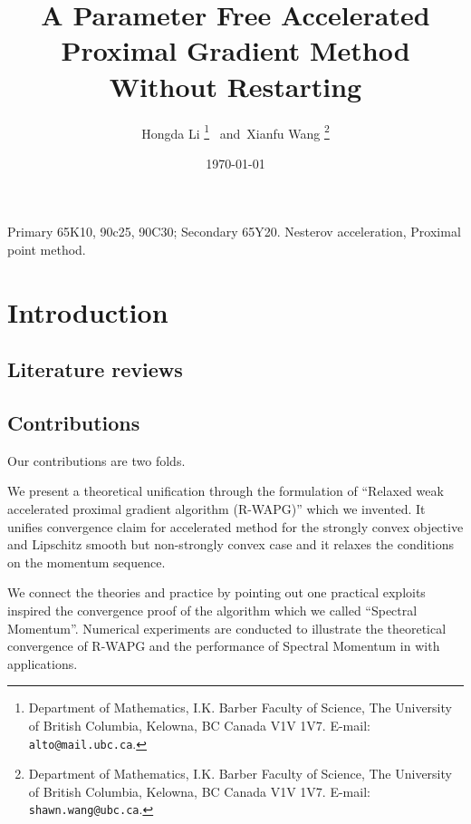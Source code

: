 \documentclass[12pt]{article}
\begin{document}
\title{{\selectfont 
        A Parameter Free Accelerated Proximal Gradient Method Without Restarting
    }}

\author{
    Hongda Li
    \thanks{Department of Mathematics, I.K. Barber Faculty of Science,
    The University of British Columbia, Kelowna, BC Canada V1V 1V7. E-mail:  \texttt{alto@mail.ubc.ca}.}~ and~Xianfu Wang
    \thanks{Department of Mathematics, I.K. Barber Faculty of Science,
    The University of British Columbia, Kelowna, BC Canada V1V 1V7. E-mail:  \texttt{shawn.wang@ubc.ca}.}
}

\date{\today}

\maketitle


\begin{abstract} 
    \noindent
    
    \cite{nesterov_lectures_2018}
\end{abstract}

Primary 65K10, 90c25, 90C30; Secondary 65Y20. 
 Nesterov acceleration, Proximal point method. 
\section{Introduction}
    \subsection{Literature reviews}
    \subsection{Contributions}
        Our contributions are two folds. 
        
        We present a theoretical unification through the formulation of ``Relaxed weak accelerated proximal gradient algorithm (R-WAPG)'' which we invented. 
        It unifies convergence claim for accelerated method for the strongly convex objective and Lipschitz smooth but non-strongly convex case and it relaxes the conditions on the momentum sequence. 
        
        We connect the theories and practice by pointing out one practical exploits inspired the convergence proof of the algorithm which we called ``Spectral Momentum''. 
        Numerical experiments are conducted to illustrate the theoretical convergence of R-WAPG and the performance of Spectral Momentum in with applications. 
\end{document}
